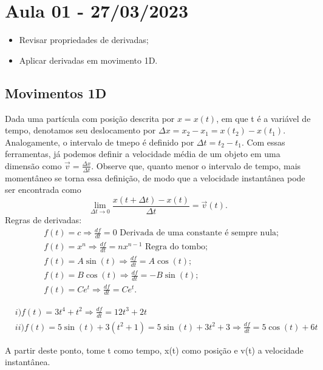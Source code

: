 \documentclass[physics_notes.tex]{subfiles}
\begin{document}
\section{Aula 01 - 27/03/2023}
\begin{itemize}
	\item Revisar propriedades de derivadas;
	\item Aplicar derivadas em movimento 1D.
\end{itemize}
\subsection{Movimentos 1D}
Dada uma partícula com posição descrita por $x = x(t)$, em que t é a variável de tempo, denotamos seu deslocamento
por $\Delta x = x_{2} - x_{1} = x(t_{2}) - x(t_{1}).$ Analogamente, o intervalo de tmepo é definido por $\Delta t = t_{2} - t_{1}$.
Com essas ferramentas, já podemos definir a velocidade média de um objeto em uma dimensão como $\vec{v} = \frac{\Delta x}{\Delta t}.$
Observe que, quanto menor o intervalo de tempo, mais momentâneo se torna essa definição, de modo que a velocidade instantânea
pode ser encontrada como
$$
	\lim_{\Delta t\to0}\frac{x(t + \Delta t) - x(t)}{\Delta t} = \vec{v}(t).
$$
Regras de derivadas:
\begin{align*}
	 & f(t) = c \Rightarrow \frac{df}{dt} = 0 \text{ Derivada de uma constante é sempre nula;} \\
	 & f(t) = x^{n} \Rightarrow \frac{df}{dt} = nx^{n-1} \text{ Regra do tombo;}               \\
	 & f(t) = A\sin{(t)} \Rightarrow \frac{df}{dt} = A\cos{(t)};                               \\
	 & f(t) = B\cos{(t)} \Rightarrow \frac{df}{dt} = -B\sin{(t)};                              \\
	 & f(t) = C e^{t} \Rightarrow \frac{df}{dt} = C e^{t}.
\end{align*}
\begin{example}
	\begin{align*}
		 & i)f(t) = 3t^{4} + t^{2} \Rightarrow \frac{df}{dt} = 12t^{3} + 2t                                         \\
		 & ii) f(t) = 5\sin{(t)} + 3(t^{2}+1) = 5\sin{(t)} + 3t^{2} + 3 \Rightarrow \frac{df}{dt} = 5\cos{(t)} + 6t
	\end{align*}
\end{example}

A partir deste ponto, tome t como tempo, x(t) como posição e v(t) a velocidade instantânea.
\end{document}
